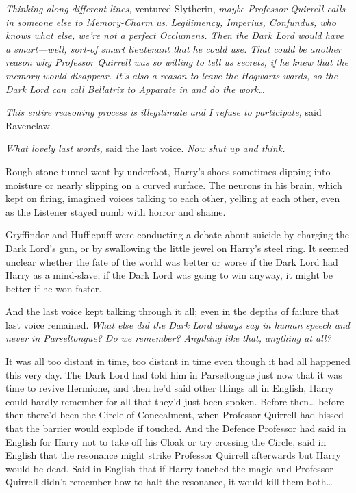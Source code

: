 \emph{Thinking along different lines,} ventured Slytherin, \emph{maybe
Professor Quirrell calls in someone else to Memory-Charm us}.
\emph{Legilimency, Imperius, Confundus, who knows what else, we're not a
perfect Occlumens. Then the Dark Lord would have a smart---well, sort-of smart
lieutenant that he could use. That could be another reason why Professor
Quirrell was so willing to tell us secrets, if he knew that the memory would
disappear. It's also a reason to leave the Hogwarts wards, so the Dark Lord can
call Bellatrix to Apparate in and do the work{\ldots}}

\emph{This entire reasoning process is illegitimate and I refuse to
participate,} said Ravenclaw.

\emph{What lovely last words,} said the last voice. \emph{Now shut up and
think.}

Rough stone tunnel went by underfoot, Harry's shoes sometimes dipping into
moisture or nearly slipping on a curved surface. The neurons in his brain,
which kept on firing, imagined voices talking to each other, yelling at each
other, even as the Listener stayed numb with horror and shame.

Gryffindor and Hufflepuff were conducting a debate about suicide by charging
the Dark Lord's gun, or by swallowing the little jewel on Harry's steel ring.
It seemed unclear whether the fate of the world was better or worse if the Dark
Lord had Harry as a mind-slave; if the Dark Lord was going to win anyway, it
might be better if he won faster.

And the last voice kept talking through it all; even in the depths of failure
that last voice remained. \emph{What else did the Dark Lord always say in human
speech and never in Parseltongue? Do we remember? Anything like that, anything
at all?}

It was all too distant in time, too distant in time even though it had all
happened this very day. The Dark Lord had told him in Parseltongue just now
that it was time to revive Hermione, and then he'd said other things all in
English, Harry could hardly remember for all that they'd just been spoken.
Before then{\ldots} before then there'd been the Circle of Concealment, when
Professor Quirrell had hissed that the barrier would explode if touched. And
the Defence Professor had said in English for Harry not to take off his Cloak
or try crossing the Circle, said in English that the resonance might strike
Professor Quirrell afterwards but Harry would be dead. Said in English that if
Harry touched the magic and Professor Quirrell didn't remember how to halt the
resonance, it would kill them both{\ldots}

